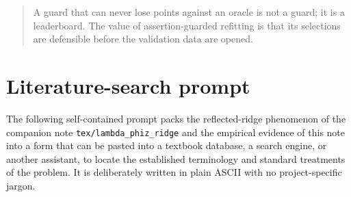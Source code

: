 \documentclass[11pt]{article}
\newcommand{\code}[1]{\texttt{#1}}
\begin{document}
\begin{quote}
A guard that can never lose points against an oracle is not a guard; it is a
leaderboard. The value of assertion-guarded refitting is that its selections
are defensible before the validation data are opened.
\end{quote}

\appendix

\section{Literature-search prompt}
\label{app:prompt}

The following self-contained prompt packs the reflected-ridge phenomenon of
the companion note \code{tex/lambda\_phiz\_ridge} and the empirical evidence
of this note into a form that can be pasted into a textbook database, a
search engine, or another assistant, to locate the established terminology
and standard treatments of the problem. It is deliberately written in plain
ASCII with no project-specific jargon.
\end{document}
